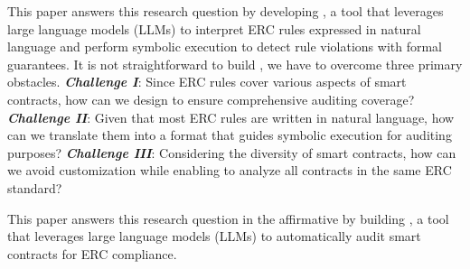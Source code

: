 This paper answers this research question by developing \emph{\Tool}, 
a tool that leverages large language models (LLMs) to interpret ERC rules 
expressed in natural language and perform symbolic execution to detect 
rule violations with formal guarantees. 
%
%
It is not straightforward to build \Tool{}, 
we have to overcome three primary obstacles.
%
\textbf{\textit{Challenge I}}: 
Since ERC rules cover various aspects of smart contracts, 
how can we design \Tool{} to ensure comprehensive auditing coverage?
\textbf{\textit{Challenge II}}: 
Given that most ERC rules are written in natural language, 
how can we translate them into a format that guides symbolic execution 
for auditing purposes?
\textbf{\textit{Challenge III}}: Considering the diversity of smart contracts, how can we avoid customization while enabling \Tool{} to analyze all contracts 
in the same ERC standard?
\fi


This paper answers this research question in the affirmative by building \emph{\Tool}, 
a tool that leverages large language models (LLMs)  to automatically audit smart contracts for ERC compliance. 

